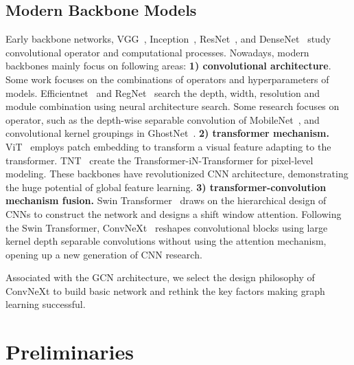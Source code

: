 \documentclass[10pt,twocolumn,letterpaper]{article}
\begin{document}
\subsection{Modern Backbone Models}
\label{ssec:related_efficient}
Early backbone networks, VGG~\cite{simonyan2014very}, Inception~\cite{szegedy2015going}, ResNet~\cite{he2016deep}, and DenseNet~\cite{huang2017densely} study convolutional operator and computational processes. Nowadays, modern backbones mainly focus on following areas:
\textbf{1) convolutional architecture}. Some work focuses on the combinations of operators and hyperparameters of models. Efficientnet~\cite{tan2019efficientnet} and RegNet~\cite{radosavovic2020designing} search the depth, width, resolution and module combination using neural architecture search. Some research focuses on operator, such as the depth-wise separable convolution of MobileNet~\cite{howard2017mobilenets}, and convolutional kernel groupings in GhostNet~\cite{han2020ghostnet}.
\textbf{2) transformer mechanism.} ViT~\cite{dosovitskiy2020image} employs patch embedding to transform a visual feature adapting to the transformer. TNT~\cite{han2021transformer} create the Transformer-iN-Transformer for pixel-level modeling. These backbones have revolutionized CNN architecture, demonstrating the huge potential of global feature learning.
\textbf{3) transformer-convolution mechanism fusion.} Swin Transformer~\cite{liu2021swin} draws on the hierarchical design of CNNs to construct the network and designs a shift window attention. Following the Swin Transformer, ConvNeXt~\cite{liu2022convnet} reshapes convolutional blocks using large kernel depth separable convolutions without using the attention mechanism, opening up a new generation of CNN research. 

Associated with the GCN architecture, we select the design philosophy of ConvNeXt to build basic network and rethink the key factors making graph learning successful. 
\section{Preliminaries}
\label{sec:Preliminaries}
\end{document}
